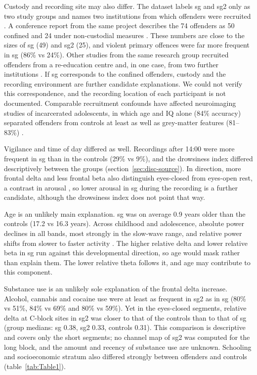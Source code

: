 Custody and recording site may also differ. The dataset labels sg and sg2 only as two study groups and names two institutions from which offenders were recruited \cite{Polo2025ds006923}. A conference report from the same project describes the 74 offenders as 50 confined and 24 under non-custodial measures \cite{RodriguezAlvarez2023}. These numbers are close to the sizes of sg (49) and sg2 (25), and violent primary offences were far more frequent in sg (86\% vs 24\%). Other studies from the same research group recruited offenders from a re-education centre and, in one case, from two further institutions \cite{Bonfante2023,RuizPena2024,SanchezTorres2024}. If sg corresponds to the confined offenders, custody and the recording environment are further candidate explanations. We could not verify this correspondence, and the recording location of each participant is not documented. Comparable recruitment confounds have affected neuroimaging studies of incarcerated adolescents, in which age and IQ alone (84\% accuracy) separated offenders from controls at least as well as grey-matter features (81--83\%) \cite{Steele2017}.

Vigilance and time of day differed as well. Recordings after 14:00 were more frequent in sg than in the controls (29\% vs 9\%), and the drowsiness index differed descriptively between the groups (section~\ref{sec:disc-source}). In direction, more frontal delta and less frontal beta also distinguish eyes-closed from eyes-open rest, a contrast in arousal \cite{Barry2007}, so lower arousal in sg during the recording is a further candidate, although the drowsiness index does not point that way.

Age is an unlikely main explanation. sg was on average 0.9 years older than the controls (17.2 vs 16.3 years). Across childhood and adolescence, absolute power declines in all bands, most strongly in the slow-wave range, and relative power shifts from slower to faster activity \cite{Whitford2007,Segalowitz2010}. The higher relative delta and lower relative beta in sg run against this developmental direction, so age would mask rather than explain them. The lower relative theta follows it, and age may contribute to this component.

Substance use is an unlikely sole explanation of the frontal delta increase. Alcohol, cannabis and cocaine use were at least as frequent in sg2 as in sg (80\% vs 51\%, 84\% vs 69\% and 80\% vs 59\%). Yet in the eyes-closed segments, relative delta at C-block sites in sg2 was closer to that of the controls than to that of sg (group medians: sg 0.38, sg2 0.33, controls 0.31). This comparison is descriptive and covers only the short segments; no channel map of sg2 was computed for the long block, and the amount and recency of substance use are unknown. Schooling and socioeconomic stratum also differed strongly between offenders and controls (table~\ref{tab:Table1}).

